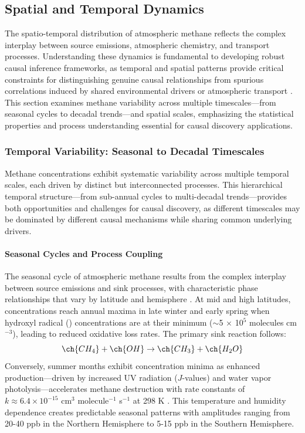 \subsection{Spatial and Temporal Dynamics}

The spatio-temporal distribution of atmospheric methane reflects the complex interplay between source emissions, atmospheric chemistry, and transport processes. Understanding these dynamics is fundamental to developing robust causal inference frameworks, as temporal and spatial patterns provide critical constraints for distinguishing genuine causal relationships from spurious correlations induced by shared environmental drivers or atmospheric transport \cite{Runge2019}. This section examines methane variability across multiple timescales—from seasonal cycles to decadal trends—and spatial scales, emphasizing the statistical properties and process understanding essential for causal discovery applications.

\subsubsection{Temporal Variability: Seasonal to Decadal Timescales}

Methane concentrations exhibit systematic variability across multiple temporal scales, each driven by distinct but interconnected processes. This hierarchical temporal structure—from sub-annual cycles to multi-decadal trends—provides both opportunities and challenges for causal discovery, as different timescales may be dominated by different causal mechanisms while sharing common underlying drivers.

\paragraph{Seasonal Cycles and Process Coupling}
The seasonal cycle of atmospheric methane results from the complex interplay between source emissions and sink processes, with characteristic phase relationships that vary by latitude and hemisphere \cite{Saunois2020}. At mid and high latitudes,  concentrations reach annual maxima in late winter and early spring when hydroxyl radical () concentrations are at their minimum ($\sim$5 $\times$ 10$^5$ molecules cm$^{-3}$), leading to reduced oxidative loss rates. The primary sink reaction follows:
\begin{equation}
	\ch{CH_4} + \ch{OH} \rightarrow \ch{CH_3} + \ch{H_2O}
\end{equation}
Conversely, summer months exhibit concentration minima as enhanced  production—driven by increased UV radiation ($J$-values) and water vapor photolysis—accelerates methane destruction with rate constants of $k \approx 6.4 \times 10^{-15}$ cm$^3$ molecule$^{-1}$ s$^{-1}$ at 298 K \cite{Knox2024}. This temperature and humidity dependence creates predictable seasonal patterns with amplitudes ranging from 20-40 ppb in the Northern Hemisphere to 5-15 ppb in the Southern Hemisphere.

